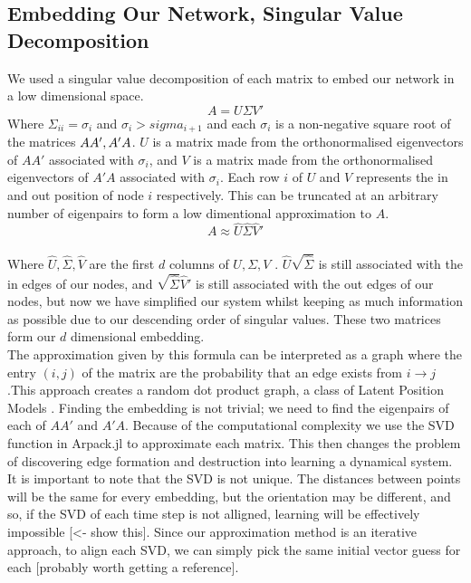 \documentclass[12pt]{article}
\begin{document}
    \subsection{Embedding Our Network, Singular Value Decomposition}
    We used a singular value decomposition of each matrix to embed our network in a low dimensional space.\
    \[
    A = U\Sigma V'
    \]
    Where $\Sigma_{ii} = \sigma_i$ and $\sigma_i > sigma_{i+1}$ and each $\sigma_i$ is a non-negative square root of the matrices $AA', \space A'A$. $U$ is a matrix made from the orthonormalised eigenvectors of $AA'$ associated with $\sigma_i$, and $V$ is a matrix made from the orthonormalised eigenvectors of $A'A$ associated with $\sigma_i$. Each row $i$ of $U$ and $V$ represents the in and out position of node $i$ respectively. This can be truncated at an arbitrary number of eigenpairs to form a low dimentional approximation to $A$.
    \[
     A \approx \hat U \hat \Sigma \hat V'
    \]\\
    Where $\hat U, \hat \Sigma, \hat V$ are the first $d$ columns of $U, \Sigma, V$ \cite{golub1971singular}. $\hat U \sqrt{\hat \Sigma}$ is still associated with the in edges of our nodes, and $\sqrt{\hat \Sigma} \hat V' $ is still associated with the out edges of our nodes, but now we have simplified our system whilst keeping as much information as possible due to our descending order of singular values. These two matrices form our $d$ dimensional embedding.\\

    The approximation given by this formula can be interpreted as a graph where the entry $(i,j)$ of the matrix are the probability that an edge exists from $i \rightarrow j$.This approach creates a random dot product graph, a class of Latent Position Models \cite{hoff2002latent}. Finding the embedding is not trivial; we need to find the eigenpairs of each of $AA'$ and $A'A$. Because of the computational complexity we use the SVD function in Arpack.jl to approximate each matrix. This then changes the problem of discovering edge formation and destruction into learning a dynamical system.\\
    It is important to note that the SVD is not unique. The distances between points will be the same for every embedding, but the orientation may be different, and so, if the SVD of each time step is not alligned, learning will be effectively impossible [<- show this]. Since our approximation method is an iterative approach, to align each SVD, we can simply pick the same initial vector guess for each [probably worth getting a reference].  
    
\end{document}
